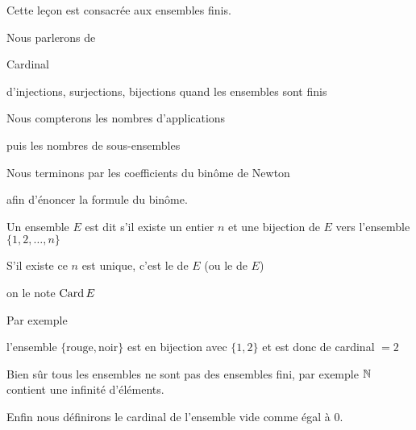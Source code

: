 





\debuttexte

\diapo

\change

Cette leçon est consacrée aux ensembles finis.

\change

Nous parlerons de 

Cardinal

\change

d'injections, surjections, bijections quand les ensembles sont finis

\change

Nous compterons les nombres d'applications

\change

puis les nombres de sous-ensembles

\change

Nous terminons 
par les coefficients du binôme de Newton

\change

afin d'énoncer la formule du binôme.


\diapo

Un ensemble $E$ est dit  s'il existe un entier $n$ et
une bijection de $E$ vers l'ensemble $\{1,2,\ldots,n\}$

\change

S'il existe ce $n$ est unique, c'est le  de $E$ (ou le  de $E$)

on le note $\mathop{\text{Card}}\nolimits E$

\change

Par exemple

l'ensemble $\{\text{rouge},\text{noir}\}$ est en bijection avec $\{1,2\}$ et est donc de cardinal $=2$

\change  

Bien sûr tous les ensembles ne sont pas des ensembles fini, par exemple
 $\mathbb{N}$ contient une infinité d'éléments.

\change

Enfin nous définirons le cardinal de l'ensemble vide comme égal à $0$.


\diapo


